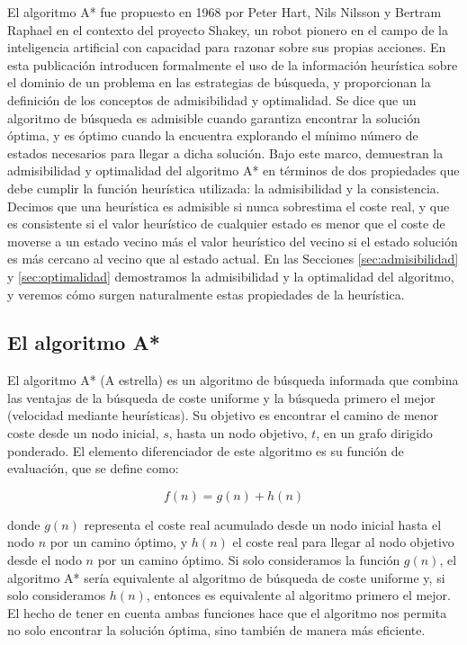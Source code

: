 \documentclass[a4paper,12pt]{article}
\begin{document}
El algoritmo A* fue propuesto en 1968 por Peter Hart, Nils Nilsson y Bertram Raphael \cite{hart_formal_1968} en el contexto del proyecto Shakey, un robot pionero en el campo de la inteligencia artificial con capacidad para razonar sobre sus propias acciones. En esta publicación introducen formalmente el uso de la información heurística sobre el dominio de un problema en las estrategias de búsqueda, y proporcionan la definición de los conceptos de admisibilidad y optimalidad. Se dice que un algoritmo de búsqueda es admisible cuando garantiza encontrar la solución óptima, y es óptimo cuando la encuentra explorando el mínimo número de estados necesarios para llegar a dicha solución. Bajo este marco, demuestran la admisibilidad y optimalidad del algoritmo A* en términos de dos propiedades que debe cumplir la función heurística utilizada: la admisibilidad y la consistencia. Decimos que una heurística es admisible si nunca sobrestima el coste real, y que es consistente si el valor heurístico de cualquier estado es menor que el coste de moverse a un estado vecino más el valor heurístico del vecino si el estado solución es más cercano al vecino que al estado actual. En las Secciones \ref{sec:admisibilidad} y \ref{sec:optimalidad} demostramos la admisibilidad y la optimalidad del algoritmo, y veremos cómo surgen naturalmente estas propiedades de la heurística.

\subsection{El algoritmo A*} \label{sec:algoritmo}

El algoritmo A* (A estrella) es un algoritmo de búsqueda informada que combina las ventajas de la búsqueda de coste uniforme y la búsqueda primero el mejor (velocidad mediante heurísticas). Su objetivo es encontrar el camino de menor coste desde un nodo inicial, $s$, hasta un nodo objetivo, $t$, en un grafo dirigido ponderado. El elemento diferenciador de este algoritmo es su función de evaluación, que se define como:

\begin{equation}
f(n) = g(n) + h(n)
\end{equation}

\noindent donde $g(n)$ representa el coste real acumulado desde un nodo inicial hasta el nodo $n$ por un camino óptimo, y $h(n)$ el coste real para llegar al nodo objetivo desde el nodo $n$ por un camino óptimo. Si solo consideramos la función $g(n)$, el algoritmo A* sería equivalente al algoritmo de búsqueda de coste uniforme y, si solo consideramos $h(n)$, entonces es equivalente al algoritmo primero el mejor. El hecho de tener en cuenta ambas funciones hace que el algoritmo nos permita no solo encontrar la solución óptima, sino también de manera más eficiente.
\end{document}
